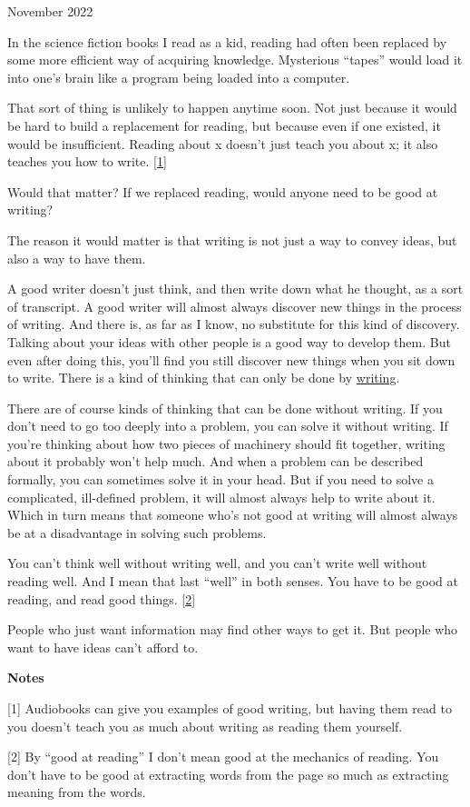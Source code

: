 November 2022

In the science fiction books I read as a kid, reading had often been
replaced by some more efficient way of acquiring knowledge. Mysterious
``tapes'' would load it into one's brain like a program being loaded
into a computer.

That sort of thing is unlikely to happen anytime soon. Not just because
it would be hard to build a replacement for reading, but because even if
one existed, it would be insufficient. Reading about x doesn't just
teach you about x; it also teaches you how to write.
{[}\hyperref[f1n]{1}{]}

Would that matter? If we replaced reading, would anyone need to be good
at writing?

The reason it would matter is that writing is not just a way to convey
ideas, but also a way to have them.

A good writer doesn't just think, and then write down what he thought,
as a sort of transcript. A good writer will almost always discover new
things in the process of writing. And there is, as far as I know, no
substitute for this kind of discovery. Talking about your ideas with
other people is a good way to develop them. But even after doing this,
you'll find you still discover new things when you sit down to write.
There is a kind of thinking that can only be done by
\href{words.html}{writing}.

There are of course kinds of thinking that can be done without writing.
If you don't need to go too deeply into a problem, you can solve it
without writing. If you're thinking about how two pieces of machinery
should fit together, writing about it probably won't help much. And when
a problem can be described formally, you can sometimes solve it in your
head. But if you need to solve a complicated, ill-defined problem, it
will almost always help to write about it. Which in turn means that
someone who's not good at writing will almost always be at a
disadvantage in solving such problems.

You can't think well without writing well, and you can't write well
without reading well. And I mean that last ``well'' in both senses. You
have to be good at reading, and read good things.
{[}\hyperref[f2n]{2}{]}

People who just want information may find other ways to get it. But
people who want to have ideas can't afford to.

\textbf{Notes}

{[}1{]} Audiobooks can give you examples of good writing, but having
them read to you doesn't teach you as much about writing as reading them
yourself.

{[}2{]} By ``good at reading'' I don't mean good at the mechanics of
reading. You don't have to be good at extracting words from the page so
much as extracting meaning from the words.
